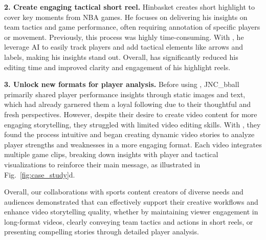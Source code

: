 \textbf{2. Create engaging tactical short reel.} Hinbasket creates short highlight to cover key moments from NBA games. He focuses on delivering his insights on team tactics and game performance, often requiring annotation of specific players or movement. Previously, this process was highly time-consuming. With \SB{}, he leverage AI to easily track players and add tactical elements like arrows and labels, making his insights stand out. Overall, \SB{} has significantly reduced his editing time and improved clarity and engagement of his highlight reels.

\textbf{3. Unlock new formats for player analysis.} Before using \SB{}, JNC\_bball primarily shared player performance insights through static images and text, which had already garnered them a loyal following due to their thoughtful and fresh perspectives. However, despite their desire to create video content for more engaging storytelling, they struggled with limited video editing skills. 
With \SB{}, they found the process intuitive and began creating dynamic video stories to analyze player strengths and weaknesses in a more engaging format. Each video integrates multiple game clips,  breaking down insights with player and tactical visualizations to reinforce their main message, as illustrated in Fig.~\ref{fig:case_study}d. 

Overall, our collaborations with sports content creators of diverse needs and audiences demonstrated that \SB{} can effectively support their creative workflows and enhance video storytelling quality, whether by maintaining viewer engagement in long-format videos, clearly conveying team tactics and actions in short reels, or presenting compelling stories through detailed player analysis.
